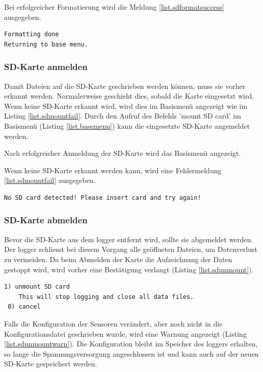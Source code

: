 Bei erfolgreicher Formatierung wird die Meldung \ref{list.sdformatsuccess} ausgegeben. 

\begin{lstlisting}[caption=Erfolgsmeldung SD formatieren, label=list.sdformatsuccess]
Formatting done
Returning to base menu.
\end{lstlisting}


\subsubsection{SD-Karte anmelden}\label{sssec.sdmount}
Damit Dateien auf die SD-Karte geschrieben werden können, muss sie vorher erkannt werden. Normalerweise geschieht dies, sobald die Karte eingesetzt wird. Wenn keine SD-Karte erkannt wird, wird dies im Basismenü angezeigt wie im Listing \ref{list.sdmountfail}. Durch den Aufruf des Befehls 'mount SD card' im Basismenü (Listing \ref{list.basemenu}) kann die eingesetzte SD-Karte angemeldet werden.

Nach erfolgreicher Anmeldung der SD-Karte wird das Basismenü angezeigt. 

Wenn keine SD-Karte erkannt werden kann, wird eine Fehlermeldung \ref{list.sdmountfail} ausgegeben.

\begin{lstlisting}[caption=Fehlermeldung SD-Karte anmelden, label=list.sdmountfail]
No SD card detected! Please insert card and try again!
\end{lstlisting}


\subsubsection{SD-Karte abmelden}\label{sssec.sdunmount}
Bevor die SD-Karte aus dem \gls{logger} entfernt wird, sollte sie abgemeldet werden. Der \gls{logger} schliesst bei diesem Vorgang alle geöffneten Dateien, um Datenverlust zu vermeiden. Da beim Abmelden der Karte die Aufzeichnung der Daten gestoppt wird, wird vorher eine Bestätigung verlangt (Listing \ref{list.sdunmount}).

\begin{lstlisting}[caption=Untermenü SD-Karte abmelden, label=list.sdunmount]
 1) unmount SD card
    This will stop logging and close all data files.
 0) cancel
\end{lstlisting}

Falls die Konfiguration der Sensoren verändert, aber noch nicht in die Konfigurationsdatei geschrieben wurde, wird eine Warnung angezeigt (Listing \ref{list.sdunmountwarn}). Die Konfiguration bleibt im Speicher des \gls{logger}s erhalten, so lange die Spannungsversorgung angeschlossen ist und kann auch auf der neuen SD-Karte gespeichert werden.

